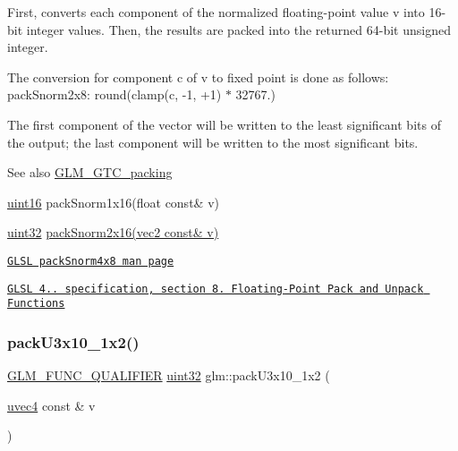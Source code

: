 First, converts each component of the normalized floating-\/point value v into 16-\/bit integer values. Then, the results are packed into the returned 64-\/bit unsigned integer.

The conversion for component c of v to fixed point is done as follows\+: pack\+Snorm2x8\+: round(clamp(c, -\/1, +1) $\ast$ 32767.)

The first component of the vector will be written to the least significant bits of the output; the last component will be written to the most significant bits.

\begin{DoxySeeAlso}{See also}
\hyperlink{group__gtc__packing}{G\+L\+M\+\_\+\+G\+T\+C\+\_\+packing} 

\hyperlink{group__gtc__type__precision_gad8c2939e1fdd8e5828b31d95c52255d5}{uint16} pack\+Snorm1x16(float const\& v) 

\hyperlink{group__gtc__type__precision_ga202b6a53c105fcb7e531f9b443518451}{uint32} \hyperlink{group__core__func__packing_ga977ab172da5494e5ac63e952afacfbe2}{pack\+Snorm2x16(vec2 const\& v)} 

\href{http://www.opengl.org/sdk/docs/manglsl/xhtml/packSnorm4x8.xml}{\tt G\+L\+SL pack\+Snorm4x8 man page} 

\href{http://www.opengl.org/registry/doc/GLSLangSpec.4.20.8.pdf}{\tt G\+L\+SL 4.. specification, section 8. Floating-\/\+Point Pack and Unpack Functions} 
\end{DoxySeeAlso}
\mbox{\label{group__gtc__packing_gaf656d8862628f96b20de7a36eaa1fe56}} 
\subsubsection{\texorpdfstring{pack\+U3x10\+\_\+1x2()}{packU3x10\_1x2()}}
{\footnotesize\ttfamily \hyperlink{setup_8hpp_a33fdea6f91c5f834105f7415e2a64407}{G\+L\+M\+\_\+\+F\+U\+N\+C\+\_\+\+Q\+U\+A\+L\+I\+F\+I\+ER} \hyperlink{group__gtc__type__precision_ga202b6a53c105fcb7e531f9b443518451}{uint32} glm\+::pack\+U3x10\+\_\+1x2 (\begin{DoxyParamCaption}\item[{\hyperlink{group__core__types_ga1c426d19627b32b14f0089f7f4ba7b1d}{uvec4} const \&}]{v }\end{DoxyParamCaption})}


